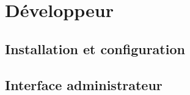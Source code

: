 \part{Développeur}

\chapter{Installation et configuration}



\chapter{Interface administrateur}


